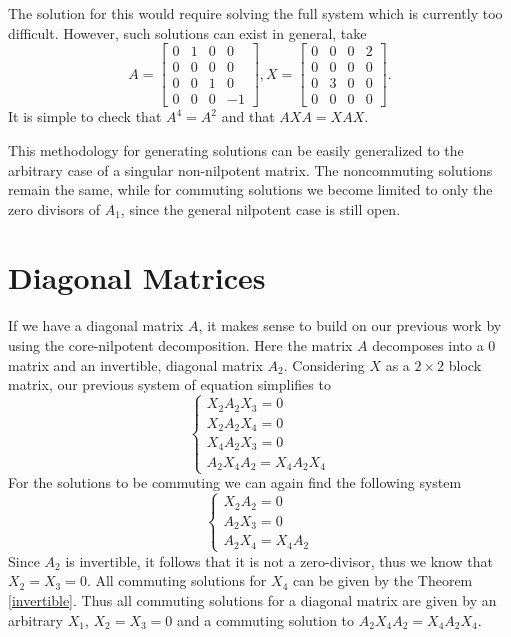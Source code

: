 \documentclass{article}
\begin{document}
\begin{algorithm}
  \begin{case}
    The solution for this would require solving the full system which is currently too difficult.
    However, such solutions can exist in general, take
    \[A = \begin{bmatrix} 0 & 1 & 0 & 0\\ 0 & 0 & 0 & 0\\ 0 & 0 & 1 & 0\\ 0 & 0 & 0 & -1 \end{bmatrix}, X = \begin{bmatrix} 0 & 0 & 0 & 2\\ 0 & 0 & 0 & 0\\ 0 & 3 & 0 & 0\\ 0 & 0 & 0 & 0 \end{bmatrix}.\]
    It is simple to check that $A^4 = A^2$ and that $A X A = X A X$.
  \end{case}
\end{algorithm}

\begin{remark}
  This methodology for generating solutions can be easily generalized to the arbitrary case of a singular non-nilpotent matrix.
  The noncommuting solutions remain the same, while for commuting solutions we become limited to only the zero divisors of $A_1$, since the general nilpotent case is still open.
\end{remark}

\section{Diagonal Matrices}
If we have a diagonal matrix $A$, it makes sense to build on our previous work by using the core-nilpotent decomposition.
Here the matrix $A$ decomposes into a $0$ matrix and an invertible, diagonal matrix $A_2$.
Considering $X$ as a $2 \times 2$ block matrix, our previous system of equation simplifies to
\[\begin{cases}
  X_2 A_2 X_3 = 0\\
  X_2 A_2 X_4 = 0\\
  X_4 A_2 X_3 = 0\\
  A_2 X_4 A_2 = X_4 A_2 X_4
\end{cases}\]
For the solutions to be commuting we can again find the following system
\[\begin{cases}
  X_2 A_2 = 0\\
  A_2 X_3 = 0\\
  A_2 X_4 = X_4 A_2
\end{cases}\]
Since $A_2$ is invertible, it follows that it is not a zero-divisor, thus we know that $X_2 = X_3 = 0$.
All commuting solutions for $X_4$ can be given by the Theorem \ref{invertible}.
Thus all commuting solutions for a diagonal matrix are given by an arbitrary $X_1$, $X_2 = X_3 = 0$ and a commuting solution to $A_2 X_4 A_2 = X_4 A_2 X_4$.
\end{document}
